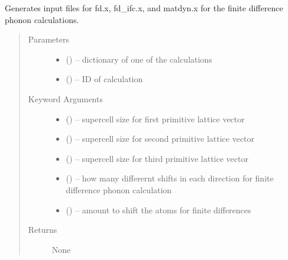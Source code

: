 \documentclass[letterpaper,10pt,english]{sphinxmanual}
\begin{document}
\begin{fulllineitems}
\label{\detokenize{run:run.write_fdx_template}}
Generates input files for fd.x, fd\_ifc.x, and matdyn.x for the finite
difference phonon calculations.
\begin{quote}\begin{description}
\item[{Parameters}] \leavevmode\begin{itemize}
\item {} 
 () -- dictionary of one of the calculations

\item {} 
 () -- ID of calculation

\end{itemize}

\item[{Keyword Arguments}] \leavevmode\begin{itemize}
\item {} 
 () -- supercell size for first primitive lattice vector

\item {} 
 () -- supercell size for second primitive lattice vector

\item {} 
 () -- supercell size for third primitive lattice vector

\item {} 
 () -- how many differernt shifts in each direction for
finite difference phonon calculation

\item {} 
 () -- amount to shift the atoms for finite differences

\end{itemize}

\item[{Returns}] \leavevmode
None

\end{description}\end{quote}

\end{fulllineitems}
\end{document}
